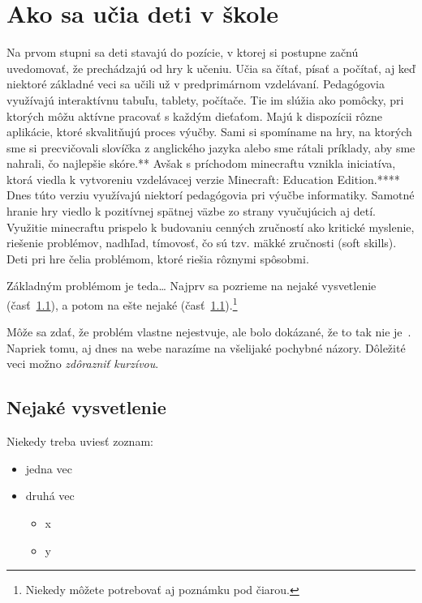 \documentclass[10pt,twoside,slovak,a4paper]{article}
\begin{document}
\section{Ako sa učia deti v škole} \label{skolaci}
Na prvom stupni sa deti stavajú do pozície, v ktorej si postupne začnú uvedomovať, že prechádzajú od hry k učeniu. Učia sa čítať, písať a počítať, aj keď niektoré základné veci sa učili už v predprimárnom vzdelávaní. Pedagógovia využívajú interaktívnu tabuľu, tablety, počítače. Tie im slúžia ako pomôcky, pri ktorých môžu aktívne pracovať s každým dieťaťom. Majú k dispozícii rôzne aplikácie, ktoré skvalitňujú proces výučby. Sami si spomíname na hry, na ktorých sme si precvičovali slovíčka z anglického jazyka alebo sme rátali príklady, aby sme nahrali, čo najlepšie skóre.** Avšak s príchodom minecraftu vznikla iniciatíva, ktorá viedla k vytvoreniu vzdelávacej verzie Minecraft: Education Edition.**** Dnes túto verziu využívajú niektorí pedagógovia pri výučbe informatiky. Samotné hranie hry viedlo k pozitívnej spätnej väzbe zo strany vyučujúcich aj detí. Využitie minecraftu prispelo k budovaniu cenných zručností ako kritické myslenie, riešenie problémov, nadhľad, tímovosť, čo sú tzv. mäkké zručnosti (soft skills). Deti pri hre čelia problémom, ktoré riešia rôznymi spôsobmi. 


Základným problémom je teda\ldots{} Najprv sa pozrieme na nejaké vysvetlenie (časť~\ref{ina:nejake}), a potom na ešte nejaké (časť~\ref{ina:nejake}).\footnote{Niekedy môžete potrebovať aj poznámku pod čiarou.}

Môže sa zdať, že problém vlastne nejestvuje\cite{Coplien:MPD}, ale bolo dokázané, že to tak nie je~\cite{Czarnecki:Staged, Czarnecki:Progress}. Napriek tomu, aj dnes na webe narazíme na všelijaké pochybné názory\cite{PLP-Framework}. Dôležité veci možno \emph{zdôrazniť kurzívou}.


\subsection{Nejaké vysvetlenie} \label{ina:nejake}

Niekedy treba uviesť zoznam:

\begin{itemize}
\item jedna vec
\item druhá vec
	\begin{itemize}
	\item x
	\item y
	\end{itemize}
\end{itemize}
\end{document}
